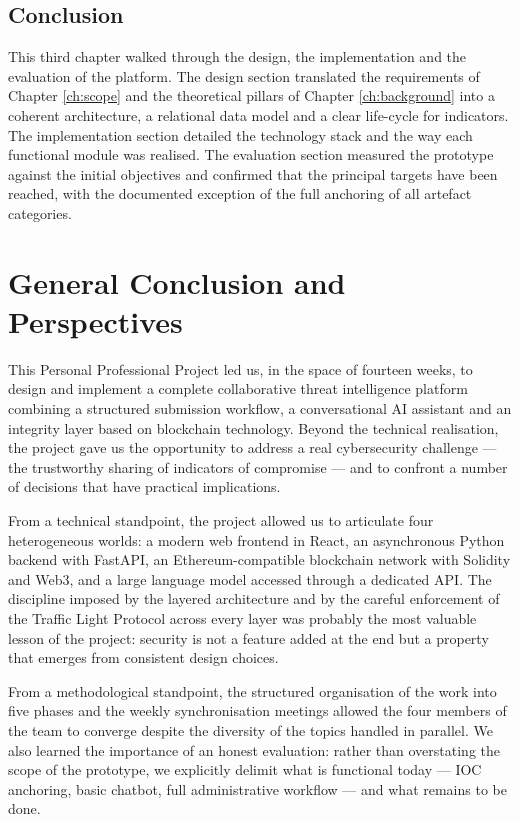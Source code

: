 \documentclass[12pt,a4paper,oneside]{book}
\begin{document}
{{\section*{Conclusion}
This third chapter walked through the design, the implementation and the
evaluation of the platform. The design section translated the requirements
of Chapter \ref{ch:scope} and the theoretical pillars of
Chapter \ref{ch:background} into a coherent architecture, a relational
data model and a clear life-cycle for indicators. The implementation section
detailed the technology stack and the way each functional module was
realised. The evaluation section measured the prototype against the initial
objectives and confirmed that the principal targets have been reached, with
the documented exception of the full anchoring of all artefact categories.

\chapter*{General Conclusion and Perspectives}

This Personal Professional Project led us, in the space of fourteen weeks,
to design and implement a complete collaborative threat intelligence
platform combining a structured submission workflow, a conversational AI
assistant and an integrity layer based on blockchain technology. Beyond the
technical realisation, the project gave us the opportunity to address a
real cybersecurity challenge --- the trustworthy sharing of indicators of
compromise --- and to confront a number of decisions that have practical
implications.

From a technical standpoint, the project allowed us to articulate four
heterogeneous worlds: a modern web frontend in React, an asynchronous
Python backend with FastAPI, an Ethereum-compatible blockchain network
with Solidity and Web3, and a large language model accessed through a
dedicated API. The discipline imposed by the layered architecture and by
the careful enforcement of the Traffic Light Protocol across every layer
was probably the most valuable lesson of the project: security is not a
feature added at the end but a property that emerges from consistent design
choices.

From a methodological standpoint, the structured organisation of the work
into five phases and the weekly synchronisation meetings allowed the four
members of the team to converge despite the diversity of the topics handled
in parallel. We also learned the importance of an honest evaluation:
rather than overstating the scope of the prototype, we explicitly delimit
what is functional today --- IOC anchoring, basic chatbot, full
administrative workflow --- and what remains to be done.

}}
\end{document}
